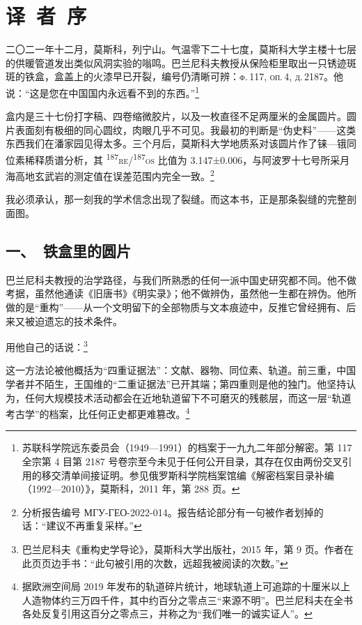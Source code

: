 \clearpage
\chapter*{译\ 者\ 序}

\noindent
二〇二一年十二月，莫斯科，列宁山。气温零下二十七度，莫斯科大学主楼十七层的供暖管道发出类似风洞实验的嗡鸣。巴兰尼科夫教授从保险柜里取出一只锈迹斑斑的铁盒，盒盖上的火漆早已开裂，编号仍清晰可辨：\textsc{ф.\,117, оп.\,4, д.\,2187}。他说：“这是您在中国国内永远看不到的东西。”\footnote{苏联科学院远东委员会（1949—1991）的档案于一九九二年部分解密。第 117 全宗第 4 目第 2187 号卷宗至今未见于任何公开目录，其存在仅由两份交叉引用的移交清单间接证明。参见俄罗斯科学院档案馆编《解密档案目录补编（1992—2010）》，莫斯科，2011 年，第 288 页。}

盒内是三十七份打字稿、四卷缩微胶片，以及一枚直径不足两厘米的金属圆片。圆片表面刻有极细的同心圆纹，肉眼几乎不可见。我最初的判断是“伪史料”——这类东西我们在潘家园见得太多。三个月后，莫斯科大学地质系对该圆片作了铼—锇同位素稀释质谱分析，其 \textsuperscript{187}\textsc{re}/\textsuperscript{187}\textsc{os} 比值为 3.147±0.006，与阿波罗十七号所采月海高地玄武岩的测定值在误差范围内完全一致。\footnote{分析报告编号 МГУ-ГЕО-2022-014。报告结论部分有一句被作者划掉的话：“建议不再重复采样。”}

我必须承认，那一刻我的学术信念出现了裂缝。而这本书，正是那条裂缝的完整剖面图。

\section*{一、\ 铁盒里的圆片}

巴兰尼科夫教授的治学路径，与我们所熟悉的任何一派中国史研究都不同。他不做考据，虽然他通读《旧唐书》《明实录》；他不做辨伪，虽然他一生都在辨伪。他所做的是“重构”——从一个文明留下的全部物质与文本痕迹中，反推它曾经拥有、后来又被迫遗忘的技术条件。

用他自己的话说：\footnote{巴兰尼科夫《重构史学导论》，莫斯科大学出版社，2015 年，第 9 页。作者在此页页边手书：“此句被引用的次数，远超我被阅读的次数。”}

这一方法论被他概括为“四重证据法”：文献、器物、同位素、轨道。前三重，中国学者并不陌生，王国维的“二重证据法”已开其端；第四重则是他的独门。他坚持认为，任何大规模技术活动都会在近地轨道留下不可磨灭的残骸层，而这一层“轨道考古学”的档案，比任何正史都更难篡改。\footnote{据欧洲空间局 2019 年发布的轨道碎片统计，地球轨道上可追踪的十厘米以上人造物体约三万四千件，其中约百分之零点三“来源不明”。巴兰尼科夫在全书各处反复引用这百分之零点三，并称之为“我们唯一的诚实证人”。}

